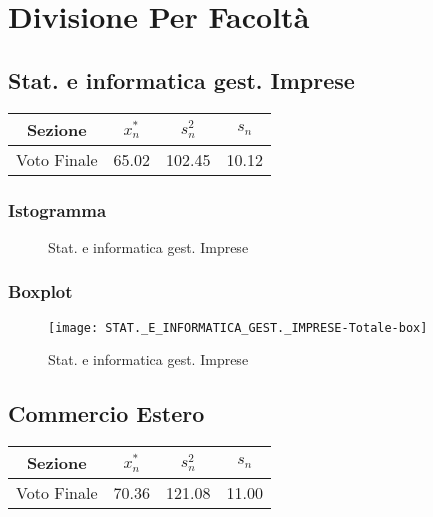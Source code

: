 \thispagestyle{empty} %
\section{Divisione Per Facoltà}
\subsection{Stat. e informatica gest. Imprese}

\begin{center}
\begin{tabular}{|c|c|c|c|}
  \hline
  Sezione & \(x_{n}^{*}\) & \(s_n^2\) & \(s_n\) \\
  \hline
  Voto Finale & 65.02 & 102.45 & 10.12 \\
  \hline
\end{tabular}
\end{center}

\subsubsection{Istogramma}
\begin{figure}[!h]
  \caption{Stat. e informatica gest. Imprese}
\end{figure}

\subsubsection{Boxplot}
\begin{figure}[!h]
  \centering
  \texttt{[image: STAT.\_E\_INFORMATICA\_GEST.\_IMPRESE-Totale-box]}
  \caption{Stat. e informatica gest. Imprese}
\end{figure}
\restoregeometry
\clearpage

\thispagestyle{empty} %
\subsection{Commercio Estero}

\begin{center}
\begin{tabular}{|c|c|c|c|}
  \hline
  Sezione & \(x_{n}^{*}\) & \(s_n^2\) & \(s_n\) \\
  \hline
  Voto Finale & 70.36 & 121.08 & 11.00 \\
  \hline
\end{tabular}
\end{center}

